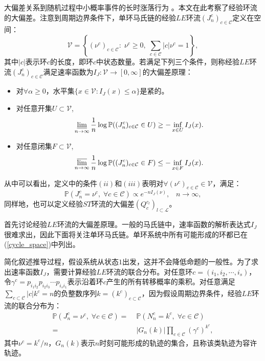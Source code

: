 大偏差关系到随机过程中小概率事件的长时涨落行为 \cite{varadhan1984large,den2000large}。本文在此考察了经验环流的大偏差。注意到周期边界条件下，单环马氏链的经验$LE$环流$(J_n^c)_{c \in \mathcal{C}}$定义在空间：
\begin{equation*}
    \mathcal{V} = \left\{(\nu^c)_{c\in \mathcal{C}}:\;\nu^c\geq 0,\;
    \sum_{c\in \mathcal{C}}|c|\nu^c  = 1\right\},
\end{equation*}
其中$|c|$表示环$c$的长度，即环$c$中状态数量。若满足下列三个条件\cite{varadhan1984large}，则称经验$LE$环流$(J_n^c)_{c \in \mathcal{C}}$满足速率函数为$I_J:\mathcal{V}\rightarrow [0,\infty]$的大偏差原理：
\begin{itemize}
    \item 对$\forall \alpha \geqslant 0$，水平集$\{x \in \mathcal{V}: I_{J}(x) \leqslant \alpha\}$是紧的。
    \item 对任意开集$U \subset \mathcal{V}$,
        \begin{equation}\label{def1}
            \varliminf_{n\to\infty}\frac{1}{n}\log\mathbb{P}((J^c_n)_{c\in\mathcal{C}}\in U)\ge-\inf_{x\in U}I_J(x).
        \end{equation}
    \item 对任意闭集$F \subset \mathcal{V}$,
        \begin{equation}\label{def2}
            \varlimsup_{n\to \infty}\frac{1}{n}\log\mathbb{P}((J^c_n)_{c\in\mathcal{C}}\in F)\le -\inf_{x\in F}I_J(x).
        \end{equation}
\end{itemize}
从中可以看出，定义中的条件$(ii)$和$(iii)$表明对$\forall (\nu^c)_{c\in\mathcal{C}}\in\mathcal{V}$，满足：
\begin{equation}\label{LDP}
    \mathbb{P}(J^c_n=\nu^c,\;\forall c\in\mathcal{C})\propto e^{-n I_J(\nu)},\;\;\;n\to\infty,
\end{equation}
同样地，也可以定义经验$ST$环流的大偏差$(Q_c^{c_l})_{l \subset \mathcal{L}}$。

首先讨论经验$LE$环流的大偏差原理。一般的马氏链中，速率函数的解析表达式$I_J$很难求出，因此下面将关注单环马氏链。单环系统中所有可能形成的环都已在 (\ref{cycle_space})中列出。

简化叙述推导过程，假设系统从状态$1$出发，这并不会降低命题的一般性。为了求出速率函数$I_J$，需要计算经验$LE$环流的联合分布。对任意环$c=(i_1, i_2, \cdots, i_s)$，令$\gamma^c = p_{i_1i_2}p_{i_2i_3}\cdots p_{i_si_1}$表示沿着环$c$产生的所有转移概率的乘积。对任意满足$\sum_{c \subset \mathcal{C}} |c| k^c=n$的负整数序列$k=(k^c)_{c\subset \mathcal{C}}$，因为假设周期边界条件，经验$LE$环流的联合分布为：
\begin{equation}\label{joint}
    \begin{split}
    \mathbb{P}\left(J^c_n=\nu^c,\;\forall c\in\mathcal{C}\right)
    =&\;\mathbb{P}\left(N^c_n=k^c,\;\forall c\in\mathcal{C}\right)\\
    =&\;|G_n(k)|\prod_{c\in\mathcal{C}}\left(\gamma^c\right)^{k^c},
    \end{split}
\end{equation}
其中$\nu^c = k^c/n$，$G_n(k)$表示$n$时刻可能形成的轨迹的集合，且称该类轨迹为容许轨迹。

